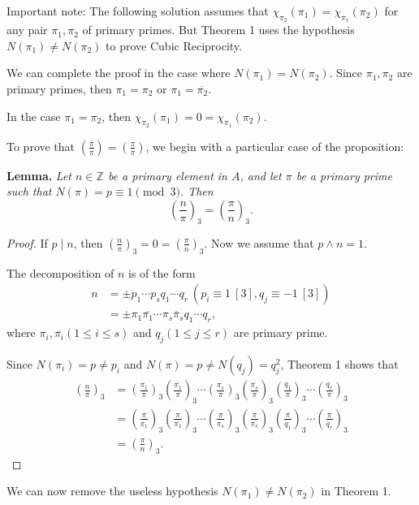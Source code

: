 \documentclass[11pt,a4paper]{article}
\newcommand{\Z}{\mathbb{Z}}
\newcommand{\legendre}[2]{\genfrac{(}{)}{}{}{#1}{#2}}
\begin{document}
\bigskip


Important note: The following solution assumes that $\chi_{\pi_2}(\pi_1) = \chi_{\pi_1}(\pi_2)$ for any pair $\pi_1,\pi_2$ of primary primes. But Theorem 1 uses the hypothesis $N(\pi_1) \ne N(\pi_2)$ to prove Cubic Reciprocity.

We can complete the proof in the case where $N(\pi_1) = N(\pi_2)$. Since $\pi_1,\pi_2$ are primary primes, then $\pi_1 = \pi_2$ or $\pi_1 = \overline{\pi_2}$.

In the case $\pi_1 = \pi_2$, then $\chi_{\pi_2}(\pi_1) = 0 =  \chi_{\pi_1}(\pi_2)$.

To prove that $\legendre{\overline{\pi}}{\pi} = \legendre{\pi}{\overline{\pi}}$, we begin with a particular case of the proposition:

\medskip
{\bf Lemma.} {\it Let $n\in \Z$ be a primary element in $A$, and let $\pi$ be a primary prime such that $N(\pi) = p \equiv 1 \pmod 3$. Then
$$\legendre{n}{\pi}_3 = \legendre{\pi}{n}_3.$$
}



\begin{proof}
If $p \mid n$, then $\legendre{n}{\pi}_3 =0 =  \legendre{\pi}{n}_3.$ Now we assume that $p \wedge n = 1$.

The decomposition of $n$ is of the form
\begin{align*} n &= \pm p_1 \cdots p_s q_1 \cdots q_r\ (p_i \equiv 1 \ [3], q_j \equiv -1 \ [3])\\
&= \pm \pi_1\overline{\pi_1} \cdots \pi_s \overline{\pi}_s q_1 \cdots q_r,
\end{align*}
where $\pi_i, \overline{\pi_i} (1\leq i \leq s)$ and $q_j (1 \leq j \leq r)$ are primary prime.

Since $N(\pi_i) = p \ne p_i$ and $N(\pi) = p \ne N(q_j) =q_j^2$, Theorem 1 shows that
\begin{align*}
\legendre{n}{\pi}_3 &=\legendre{\pi_1}{\pi}_3\legendre{\overline{\pi_1}}{\pi}_3\cdots \legendre{\pi_s}{\pi}_3\legendre{\overline{\pi_s}}{\pi}_3 \legendre{q_1}{\pi}_3  \cdots \legendre{q_r}{\pi}_3 \\
&=\legendre{\pi}{\pi_1}_3\legendre{\pi}{\overline{\pi_1}}_3\cdots \legendre{\pi}{\pi_s}_3\legendre{\pi}{\overline{\pi_s}}_3 \legendre{\pi}{q_1}_3  \cdots \legendre{\pi}{q_r}_3 \\
&= \legendre{\pi}{n}_3.
\end{align*}
\end{proof}

We can now remove the useless hypothesis $N(\pi_1) \ne N(\pi_2)$ in Theorem 1.
\end{document}
